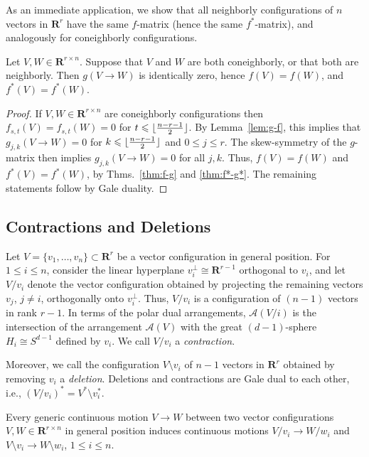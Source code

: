 \documentclass[a4paper,USenglish,cleveref, autoref, thm-restate,nolineno]{socg-lipics-v2021}
\newcommand{\arr}{\mathcal{A}}
\renewcommand{\leq}{\leqslant}
\newcommand{\R}{\mathbf{R}}
\DeclarePairedDelimiter\floor{\lfloor}{\rfloor}
\begin{document}
As an immediate application, we show that all neighborly configurations of $n$ vectors in $\R^r$ have the same $f$-matrix (hence the same $f^*$-matrix), and analogously for coneighborly configurations.
\begin{proposition}
\label{prop:f-neighborly-coneighborly}
Let $V,W \in \R^{r\times n}$. Suppose that $V$ and $W$ are both coneighborly, or that both are neighborly. Then $g(V\to W)$ is identically zero, hence $f(V)=f(W)$, and $f^*(V)=f^*(W)$.
\end{proposition}
\begin{proof} 
If $V,W \in \R^{r\times n}$ are coneighborly configurations then $f_{s,t}(V)=f_{s,t}(W)=0$ for $t \leq \floor{\frac{n-r-1}{2}}$. By Lemma~\ref{lem:g-f}, this implies that $g_{j,k}(V\to W)=0$ for $k\leq  \floor{\frac{n-r-1}{2}}$ and $0\leq j\leq r$. The skew-symmetry of the $g$-matrix then implies  $g_{j,k}(V\to W)=0$ for all $j,k$. Thus, $f(V)=f(W)$ and $f^*(V)=f^*(W)$, by Thms.~\ref{thm:f-g} and \ref{thm:f*-g*}. The remaining statements follow by Gale duality.
\end{proof}


\subsection{Contractions and Deletions}
\label{sec:deletion-contraction}
Let $V=\{v_1,\dots,v_n\} \subset \R^r$ be a vector configuration in general position. For $1\leq i\leq n$, consider the linear hyperplane $v_i^\bot \cong \R^{r-1}$ orthogonal to $v_i$, and let $V/v_i$ denote the vector configuration obtained by projecting the remaining vectors $v_j$, $j\neq i$, orthogonally onto $v_i^\bot $. Thus, $V/v_i$ is a configuration of $(n-1)$ vectors in rank $r-1$. In terms of the polar dual arrangements, $\arr(V/i)$ is the intersection of the arrangement $\arr(V)$ with the great $(d-1)$-sphere $H_i\cong S^{d-1}$ defined by $v_i$. We call $V/v_i$ a \emph{contraction}.

Moreover, we call the configuration $V\setminus v_i$ of $n-1$ vectors in $\R^r$ obtained by removing $v_i$ a \emph{deletion}. Deletions and contractions are Gale dual to each other, i.e., $(V/v_i)^*=V^*\! \setminus \!v_i^*$.

Every generic continuous motion $V\to W$ between two vector configurations $V,W \in \R^{r\times n}$ in general position induces continuous motions $V/v_i \to W/w_i$ and $V\setminus v_i \to W\setminus w_i$, $1\leq i \leq n$.
\end{document}
